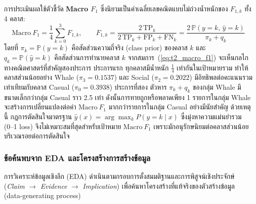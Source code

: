 การประเมินผลใช้ตัวชี้วัด \textbf{Macro $F_1$} ซึ่งนิยามเป็นค่าเฉลี่ยเลขคณิตแบบไม่ถ่วงน้ำหนักของ $F_{1,k}$ ทั้ง 4 คลาส:
\begin{equation}
\label{eq:t2_macro_f1}
\mathrm{Macro}\ F_1 = \frac{1}{4}\sum_{k=0}^{3} F_{1,k}, \qquad
F_{1,k} = \frac{2\,\mathrm{TP}_k}{2\,\mathrm{TP}_k + \mathrm{FP}_k + \mathrm{FN}_k}
= \frac{2\,\mathbb{P}(y=k,\,\hat{y}=k)}{\pi_k + q_k}
\end{equation}
โดยที่ $\pi_k = \mathbb{P}(y=k)$ คือสัดส่วนความถี่จริง (class prior) ของคลาส $k$ และ $q_k = \mathbb{P}(\hat{y}=k)$ คือสัดส่วนการทำนายคลาส $k$ จากสมการ~(\ref{eq:t2_macro_f1}) จะเห็นกลไกทางคณิตศาสตร์ที่สำคัญสองประการ ประการแรก ทุกคลาสมีน้ำหนัก $\frac{1}{4}$ เท่ากันในเป้าหมายรวม ทำให้คลาสส่วนน้อยอย่าง Whale ($\pi_3 = 0.1537$) และ Social ($\pi_2 = 0.2022$) มีอิทธิพลต่อคะแนนรวมเท่าเทียมกับคลาส Casual ($\pi_0 = 0.3938$) ประการที่สอง ตัวหาร $\pi_k + q_k$ ของกลุ่ม Whale มีขนาดเล็กกว่ากลุ่ม Casual ราว 2.5 เท่า ดังนั้นการทายถูกหรือพลาดเพียง 1 รายการในกลุ่ม Whale จะสร้างการเปลี่ยนแปลงต่อค่า $\mathrm{Macro}\ F_1$ มากกว่ารายการในกลุ่ม Casual อย่างมีนัยสำคัญ ด้วยเหตุนี้ กฎการตัดสินใจมาตรฐาน $\hat{y}(x) = \arg\max_k P(y=k \mid x)$ ซึ่งมุ่งหาความแม่นยำรวม (0--1 loss) จึงไม่เหมาะสมที่สุดสำหรับเป้าหมาย $\mathrm{Macro}\ F_1$ เพราะมักอนุรักษนิยมต่อคลาสส่วนน้อยบริเวณรอยต่อการตัดสินใจ

\subsubsection{ข้อค้นพบจาก EDA และโครงสร้างการสร้างข้อมูล}
\label{subsubsec:t2_eda_dgp}

การวิเคราะห์ข้อมูลเชิงลึก (EDA) ดำเนินตามกรอบการตั้งสมมติฐานและการพิสูจน์เชิงประจักษ์ (\textit{Claim $\to$ Evidence $\to$ Implication}) เพื่อค้นหาโครงสร้างที่แท้จริงของตัวสร้างข้อมูล (data-generating process)

